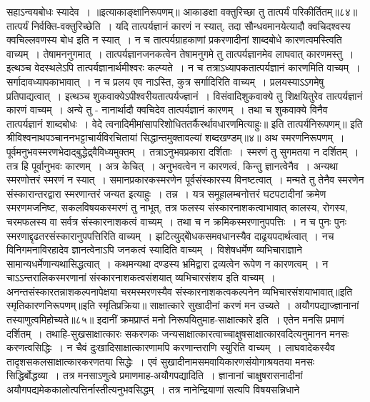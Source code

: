 सहाऽन्वयबोधः स्यादेव~।
॥इत्याकाङ्क्षानिरूपणम्॥
आकाङक्षा वक्तुरिच्छा तु तात्पर्यं परिकीर्तितम्॥८४॥
तात्पर्यं निर्वक्ति-वक्तुरिच्छेति~। यदि तात्पर्यज्ञानं कारणं न स्यात्, तदा सौन्धवमानयेत्यादौ क्वचिदश्वस्य क्वचिल्लवणस्य बोध इति न स्यात्~। न च
तात्पर्यग्राहकाणां प्रकरणादीनां शाब्दबोधे कारणत्वमस्त्विति वाच्यम्~। तेषामननुगमात्~। तात्पर्यज्ञानजनकत्वेन तेषामनुगमे तु तात्पर्यज्ञानमेव लाघवात् कारणमस्तु~।
इत्थञ्च वेदस्थलेऽपि तात्पर्यज्ञानार्थमीश्वरः कल्प्यते~। न च तत्राऽध्यापकतात्पर्यज्ञानं कारणमिति वाच्यम्~। सर्गादावध्यापकाभावात्~। न च प्रलय एव नाऽस्ति,
कुत्र सर्गादिरिति वाच्यम्~। प्रलयस्याऽऽगमेषु प्रतिपाद्यत्वात्~।
इत्थञ्च शुकवाक्येऽपीश्वरीयतात्पर्यज्ज्ञानं~। विसंवादिशुकवाक्ये तु शिक्षयितुरेव तात्पर्यज्ञानं कारणं वाच्यम्~।
अन्ये तु - नानार्थादौ क्वचिदेव तात्पर्यज्ञानं कारणम्~। तथा च शुकवाक्ये विनैव तात्पर्यज्ञानं शाब्दबोधः~। वेदे त्वनादिमीमांसापरिशोधिततर्कैरर्थावधारणमित्याहुः॥
इति तात्पर्यनिरूपणम्॥
इति श्रीविश्वनाथपञ्चाननभट्टाचार्यविरचितायां सिद्धान्तमुक्तावल्यां शब्दखण्डम्॥४॥
अथ स्मरणनिरूपणम्~।
पूर्वमनुभवस्मरणभेदाद्बुद्धेद्र्वैविध्यमुक्तम्~। तत्राऽनुभवप्रकारा दर्शिताः~। स्मरणं तु सुगमतया न दर्शितम्~। तत्र हि पूर्वानुभवः कारणम्~।
अत्र केचित्~। अनुभवत्वेन न कारणत्वं, किन्तु ज्ञानत्वेनैव~। अन्यथा स्मरणोत्तरं स्मरणं न स्यात्~। समानप्रकारकस्मरणेन पूर्वसंस्कारस्य विनष्टत्वात्~। मन्मते तु
तेनैव स्मरणेन संस्कारान्तरद्वारा स्मरणान्तरं जन्यत इत्याहुः~। तन्न~। यत्र समूहालम्बनोत्तरं घटपटादीनां क्रमेण स्मरणमजनिष्ट, सकलविषयकस्मरणं तु नाभूत्, तत्र फलस्य
संस्कारनाशकत्वाभावात् कालस्य, रोगस्य, चरमफलस्य वा सर्वत्र संस्कारनाशकत्वं वाच्यम्~। तथा च न क्रमिकस्मरणानुपपत्तिः~। न च पुनः पुनः स्मरणाद्दृढतरसंस्कारानुपपत्तिरिति
वाच्यम्~। झटित्युद्बोेधकसमवधानस्यैव दाढ्र्यपदार्थत्वात्~। नच विनिगमनाविरहादेव ज्ञानत्वेनाऽपि जनकत्वं स्यादिति वाच्यम्~। विशेषधर्मेण व्यभिचाराज्ञाने
सामान्यधर्मेणान्यथासिद्धत्वात्~। कथमन्यथा दण्डस्य भ्रमिद्वारा द्रव्यत्वेन रूपेण न कारणत्वम्~। न चाऽऽन्तरालिकस्मरणानां संस्कारनाशकत्वसंशयात् व्यभिचारसंशय इति
वाच्यम्~। अनन्तसंस्कारतन्नाशकल्पनापेक्षया चरमस्मरणस्यैव संस्कारनाशकत्वकल्पनेन व्यभिचारसंशयाभावात्॥इति स्मृतिकारणनिरूपणम्॥इति स्मृतिप्रक्रिया॥
साक्षात्कारे सुखादीनां करणं मन उच्यते~।
अयौगपद्याज्ज्ञानानां तस्याणुत्वमिहोच्यते॥८५॥
इदानीं क्रमप्राप्तं मनो निरूपयितुमाह-साक्षात्कारे इति~। एतेन मनसि प्रमाणं दर्शितम्~। तथाहि-सुखसाक्षात्कारः सकरणकः जन्यसाक्षात्कारत्वाच्चाक्षुषसाक्षात्कारवदित्यनुमानन
मनसः करणत्वसिद्धिः~। न चैवं दुःखादिसाक्षात्कारणामपि करणान्तराणि स्युरिति वाच्यम्~। लाघवादेकस्यैव तादृशसकलसाक्षात्कारकरणतया सिद्धेः~। एवं
सुखादीनामसमवायिकारणसंयोगाश्रयतया मनसः सिद्धिर्बोद्धव्या~।
तत्र मनसाऽणुत्वे प्रमाणमाह-अयौगपद्यादिति~। ज्ञानानां चाक्षुषरासनादीनां अयौगपद्यमेककालोत्पत्तिर्नास्तीत्यनुभवसिद्धम्~। तत्र नानेन्द्रियाणां सत्यपि विषयसन्निधाने
